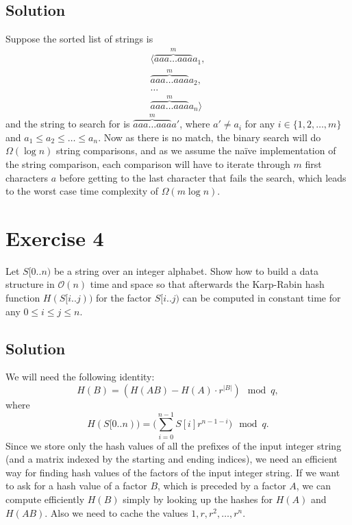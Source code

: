 \documentclass[10pt]{article}
\begin{document}
\subsection*{Solution}
Suppose the sorted list of strings is 
\begin{align*}
\langle \overbrace{aaa \dots aaa}^{m}a_1, \\
\overbrace{aaa \dots aaa}^{m}a_2, \\
\dots \\
\overbrace{aaa \dots aaa}^{m}a_n \rangle
\end{align*}
and the string to search for is $\overbrace{aaa \dots aaa}^{m}a'$, where $a' \neq a_i$ for any $i \in \{ 1, 2, \dots, m \}$ and $a_1 \leq  a_2 \leq \dots \leq a_n$. Now as there is no match, the binary search will do $\Omega(\log n)$ string comparisons, and as we assume the naïve implementation of the string comparison, each comparison will have to iterate through $m$ first characters $a$ before getting to the last character that fails the search, which leads to the worst case time complexity of $\Omega(m \log n)$.

\section*{Exercise 4}
\color{blue}
Let $S[0..n)$ be a string over an integer alphabet. Show how to build a data structure in $\mathcal{O}(n)$ time and space so that afterwards the Karp-Rabin hash function $H(S[i..j))$ for the factor $S[i..j)$ can be computed in constant time for any $0 \leq i \leq j \leq n$.
\color{black}

\subsection*{Solution}
We will need the following identity:
\[
H(B) = (H(AB) - H(A) \cdot r^{|B|}) \mod q,
\]
where
\[
H(S[0..n)) = \Bigg( \sum_{i = 0}^{n - 1} S[i] r^{n - 1 - i} \Bigg) \mod q.
\]
Since we store only the hash values of all the prefixes of the input integer string (and a matrix indexed by the starting and ending indices), we need an efficient way for finding hash values of the factors of the input integer string. If we want to ask for a hash value of a factor $B$, which is preceded by a factor $A$, we can compute efficiently $H(B)$ simply by looking up the hashes for $H(A)$ and $H(AB)$. Also we need to cache the values $1, r, r^2, \dots, r^n$.
\end{document}

